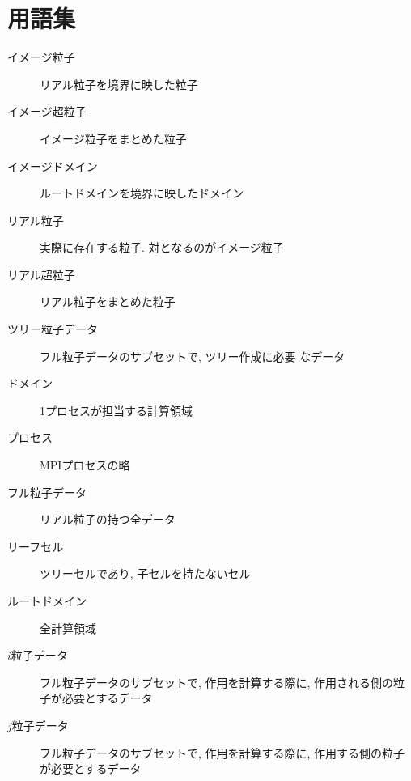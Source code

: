\documentclass[12pt,a4paper]{jarticle}
\begin{document}
\newpage

\section{用語集}
\label{sec:terms}

\begin{description}
\item[イメージ粒子] リアル粒子を境界に映した粒子
\item[イメージ超粒子] イメージ粒子をまとめた粒子
\item[イメージドメイン] ルートドメインを境界に映したドメイン
\item[リアル粒子] 実際に存在する粒子. 対となるのがイメージ粒子
\item[リアル超粒子] リアル粒子をまとめた粒子
\item[ツリー粒子データ] フル粒子データのサブセットで, ツリー作成に必要
  なデータ
\item[ドメイン] 1プロセスが担当する計算領域
\item[プロセス] MPIプロセスの略
\item[フル粒子データ] リアル粒子の持つ全データ
\item[リーフセル] ツリーセルであり, 子セルを持たないセル
\item[ルートドメイン] 全計算領域
\item[$i$粒子データ] フル粒子データのサブセットで, 作用を計算する際に,
  作用される側の粒子が必要とするデータ
\item[$j$粒子データ] フル粒子データのサブセットで, 作用を計算する際に,
  作用する側の粒子が必要とするデータ
\end{description}
\end{document}
